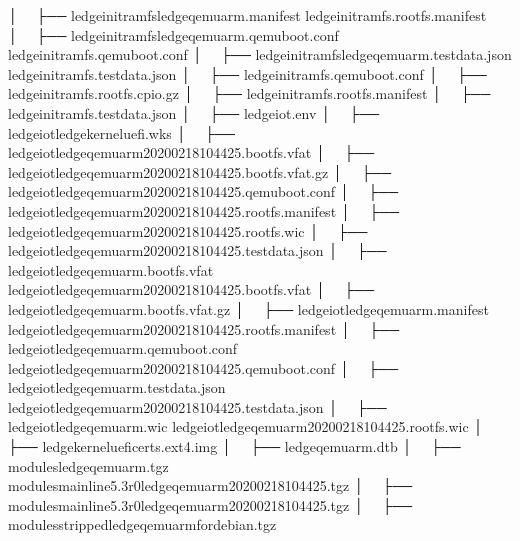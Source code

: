\documentclass[a4paper,10pt,oneside,english]{sphinxmanual}
\begin{document}
\begin{sphinxVerbatim}[commandchars=\\\{\}]
│   ├── ledge\PYGZhy{}initramfs\PYGZhy{}ledge\PYGZhy{}qemuarm.manifest \PYGZhy{}\PYGZgt{} ledge\PYGZhy{}initramfs.rootfs.manifest
│   ├── ledge\PYGZhy{}initramfs\PYGZhy{}ledge\PYGZhy{}qemuarm.qemuboot.conf \PYGZhy{}\PYGZgt{} ledge\PYGZhy{}initramfs.qemuboot.conf
│   ├── ledge\PYGZhy{}initramfs\PYGZhy{}ledge\PYGZhy{}qemuarm.testdata.json \PYGZhy{}\PYGZgt{} ledge\PYGZhy{}initramfs.testdata.json
│   ├── ledge\PYGZhy{}initramfs.qemuboot.conf
│   ├── ledge\PYGZhy{}initramfs.rootfs.cpio.gz
│   ├── ledge\PYGZhy{}initramfs.rootfs.manifest
│   ├── ledge\PYGZhy{}initramfs.testdata.json
│   ├── ledge\PYGZhy{}iot.env
│   ├── ledge\PYGZhy{}iot\PYGZhy{}ledge\PYGZhy{}kernel\PYGZhy{}uefi.wks
│   ├── ledge\PYGZhy{}iot\PYGZhy{}ledge\PYGZhy{}qemuarm\PYGZhy{}20200218104425.bootfs.vfat
│   ├── ledge\PYGZhy{}iot\PYGZhy{}ledge\PYGZhy{}qemuarm\PYGZhy{}20200218104425.bootfs.vfat.gz
│   ├── ledge\PYGZhy{}iot\PYGZhy{}ledge\PYGZhy{}qemuarm\PYGZhy{}20200218104425.qemuboot.conf
│   ├── ledge\PYGZhy{}iot\PYGZhy{}ledge\PYGZhy{}qemuarm\PYGZhy{}20200218104425.rootfs.manifest
│   ├── ledge\PYGZhy{}iot\PYGZhy{}ledge\PYGZhy{}qemuarm\PYGZhy{}20200218104425.rootfs.wic
│   ├── ledge\PYGZhy{}iot\PYGZhy{}ledge\PYGZhy{}qemuarm\PYGZhy{}20200218104425.testdata.json
│   ├── ledge\PYGZhy{}iot\PYGZhy{}ledge\PYGZhy{}qemuarm.bootfs.vfat \PYGZhy{}\PYGZgt{} ledge\PYGZhy{}iot\PYGZhy{}ledge\PYGZhy{}qemuarm\PYGZhy{}20200218104425.bootfs.vfat
│   ├── ledge\PYGZhy{}iot\PYGZhy{}ledge\PYGZhy{}qemuarm.bootfs.vfat.gz
│   ├── ledge\PYGZhy{}iot\PYGZhy{}ledge\PYGZhy{}qemuarm.manifest \PYGZhy{}\PYGZgt{} ledge\PYGZhy{}iot\PYGZhy{}ledge\PYGZhy{}qemuarm\PYGZhy{}20200218104425.rootfs.manifest
│   ├── ledge\PYGZhy{}iot\PYGZhy{}ledge\PYGZhy{}qemuarm.qemuboot.conf \PYGZhy{}\PYGZgt{} ledge\PYGZhy{}iot\PYGZhy{}ledge\PYGZhy{}qemuarm\PYGZhy{}20200218104425.qemuboot.conf
│   ├── ledge\PYGZhy{}iot\PYGZhy{}ledge\PYGZhy{}qemuarm.testdata.json \PYGZhy{}\PYGZgt{} ledge\PYGZhy{}iot\PYGZhy{}ledge\PYGZhy{}qemuarm\PYGZhy{}20200218104425.testdata.json
│   ├── ledge\PYGZhy{}iot\PYGZhy{}ledge\PYGZhy{}qemuarm.wic \PYGZhy{}\PYGZgt{} ledge\PYGZhy{}iot\PYGZhy{}ledge\PYGZhy{}qemuarm\PYGZhy{}20200218104425.rootfs.wic
│   ├── ledge\PYGZhy{}kernel\PYGZhy{}uefi\PYGZhy{}certs.ext4.img
│   ├── ledge\PYGZhy{}qemuarm.dtb
│   ├── modules\PYGZhy{}ledge\PYGZhy{}qemuarm.tgz \PYGZhy{}\PYGZgt{} modules\PYGZhy{}\PYGZhy{}mainline\PYGZhy{}5.3\PYGZhy{}r0\PYGZhy{}ledge\PYGZhy{}qemuarm\PYGZhy{}20200218104425.tgz
│   ├── modules\PYGZhy{}\PYGZhy{}mainline\PYGZhy{}5.3\PYGZhy{}r0\PYGZhy{}ledge\PYGZhy{}qemuarm\PYGZhy{}20200218104425.tgz
│   ├── modules\PYGZhy{}stripped\PYGZhy{}ledge\PYGZhy{}qemuarm\PYGZhy{}for\PYGZhy{}debian.tgz

\end{sphinxVerbatim}
\end{document}
